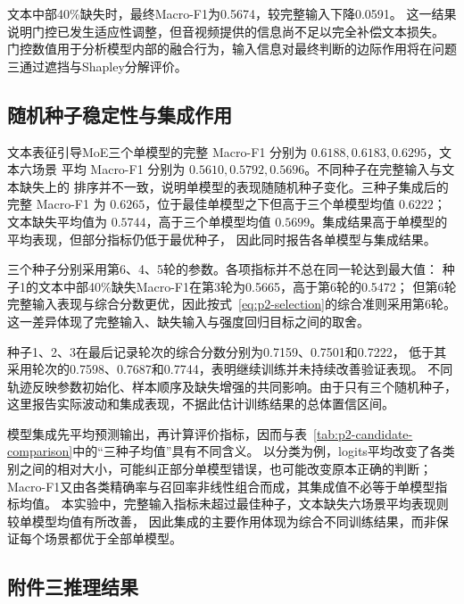 \documentclass[bwprint]{gmcmthesis}
\begin{document}
文本中部40\%缺失时，最终Macro-F1为0.5674，较完整输入下降0.0591。
这一结果说明门控已发生适应性调整，但音视频提供的信息尚不足以完全补偿文本损失。
门控数值用于分析模型内部的融合行为，输入信息对最终判断的边际作用将在问题三通过遮挡与Shapley分解评价。

\subsection{随机种子稳定性与集成作用}

文本表征引导MoE三个单模型的完整 Macro-F1 分别为 $0.6188,0.6183,0.6295$，文本六场景
平均 Macro-F1 分别为 $0.5610,0.5792,0.5696$。不同种子在完整输入与文本缺失上的
排序并不一致，说明单模型的表现随随机种子变化。三种子集成后的完整 Macro-F1 为
$0.6265$，位于最佳单模型之下但高于三个单模型均值 $0.6222$；文本缺失平均值为
$0.5744$，高于三个单模型均值 $0.5699$。集成结果高于单模型的平均表现，但部分指标仍低于最优种子，
因此同时报告各单模型与集成结果。


三个种子分别采用第6、4、5轮的参数。各项指标并不总在同一轮达到最大值：
种子1的文本中部40\%缺失Macro-F1在第3轮为0.5665，高于第6轮的0.5472；
但第6轮完整输入表现与综合分数更优，因此按式~\eqref{eq:p2-selection}的综合准则采用第6轮。
这一差异体现了完整输入、缺失输入与强度回归目标之间的取舍。

种子1、2、3在最后记录轮次的综合分数分别为0.7159、0.7501和0.7222，
低于其采用轮次的0.7598、0.7687和0.7744，表明继续训练并未持续改善验证表现。
不同轨迹反映参数初始化、样本顺序及缺失增强的共同影响。由于只有三个随机种子，
这里报告实际波动和集成表现，不据此估计训练结果的总体置信区间。

模型集成先平均预测输出，再计算评价指标，因而与表~\ref{tab:p2-candidate-comparison}中的“三种子均值”具有不同含义。
以分类为例，logits平均改变了各类别之间的相对大小，可能纠正部分单模型错误，也可能改变原本正确的判断；
Macro-F1又由各类精确率与召回率非线性组合而成，其集成值不必等于单模型指标均值。
本实验中，完整输入指标未超过最佳种子，文本缺失六场景平均表现则较单模型均值有所改善，
因此集成的主要作用体现为综合不同训练结果，而非保证每个场景都优于全部单模型。


\subsection{附件三推理结果}
\end{document}
